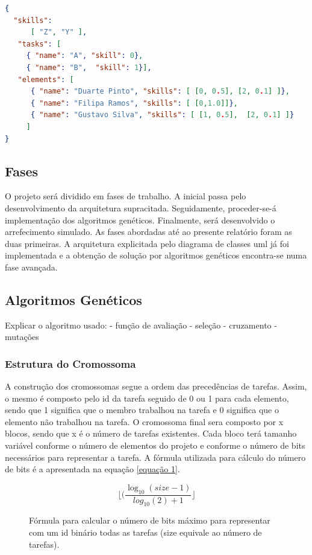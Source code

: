 \begin{titlepage}
\begin{lstlisting}[language=json,firstnumber=1]
{ 
  "skills": 
      [ "Z", "Y" ], 
   "tasks": [
     { "name": "A", "skill": 0},
     { "name": "B",  "skill": 1}],
   "elements": [
      { "name": "Duarte Pinto", "skills": [ [0, 0.5], [2, 0.1] ]},
      { "name": "Filipa Ramos", "skills": [ [0,1.0]]},
      { "name": "Gustavo Silva", "skills": [ [1, 0.5],  [2, 0.1] ]}
     ]
}
\end{lstlisting}

\subsection{Fases}
\justify\normalsize 
O projeto será dividido em fases de trabalho. A inicial passa pelo desenvolvimento da arquitetura supracitada. Seguidamente, proceder-se-á implementação dos algoritmos genéticos. Finalmente, será desenvolvido o arrefecimento simulado. As fases abordadas até ao presente relatório foram as duas primeiras. A arquitetura explicitada pelo diagrama de classes uml já foi implementada e a obtenção de solução por algoritmos genéticos encontra-se numa fase avançada.

\subsection{Algoritmos Genéticos}
\justify\normalsize
Explicar o algoritmo usado:
	- função de avaliação
	- seleção
	- cruzamento
	- mutações

\subsubsection{Estrutura do Cromossoma}
\justify\normalsize
A construção dos cromossomas segue a ordem das precedências de tarefas. Assim, o mesmo é composto pelo id da tarefa seguido de 0 ou 1 para cada elemento, sendo que 1 significa que o membro trabalhou na tarefa e 0 significa que o elemento não trabalhou na tarefa. O cromossoma final sera composto por x blocos, sendo que x é o número de tarefas existentes. Cada bloco terá tamanho variável conforme o número de elementos do projeto e conforme o número de bits necessários para representar a tarefa. A fórmula utilizada para cálculo do número de bits é a apresentada na equação \ref{equação 1}.

\begin{figure}[!ht]
\begin{equation} \label{equação 1}
\lfloor (\dfrac{\log_{10}(size-1)}{log_{10}(2)+1} \rfloor
\end{equation}
\caption{Fórmula para calcular o número de bits máximo para representar com um id binário todas as tarefas (size equivale ao número de tarefas).}
\end{figure}


\end{titlepage}
